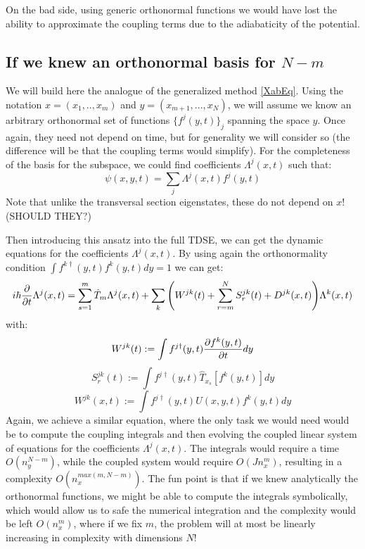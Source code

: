 \documentclass[11pt, a4paper]{article} %
\begin{document}
On the bad side, using generic orthonormal functions we would have lost the ability to approximate the coupling terms due to the adiabaticity of the potential.

\subsection{If we knew an orthonormal basis for $N-m$}
We will build here the analogue of the generalized method \eqref{XabEq}. Using the notation $x=(x_1,..,x_m)$ and $y=(x_{m+1},...,x_N)$, we will assume we know an arbitrary orthonormal set of functions $\{ f^j(y,t) \}_j$ spanning the space $y$. Once again, they need not depend on time, but for generality we will consider so (the difference will be that the coupling terms would simplify). For the completeness of the basis for the subspace, we could find coefficients $\Lambda^j(x,t)$ such that:
\begin{equation}
\psi(x,y,t)=\sum_j \Lambda^j(x,t) f^j(y,t)
\end{equation}
Note that unlike the transversal section eigenstates, these do not depend on $x$! (SHOULD THEY?)

Then introducing this ansatz into the full TDSE, we can get the dynamic equations for the coefficients $\Lambda^j(x,t)$. By using again the orthonormality condition $\int f^{k\dagger}(y,t)f^k(y,t)dy=1$ we can get:
\begin{equation}
i\hbar \pdv{}{t}\Lambda^j(x,t)= \sum_{s=1}^m \hat{T}_m \Lambda^j(x,t) + \sum_k \qty( W^{jk}(t)+\sum_{r=m}^NS^{jk}_r(t)+D^{jk}(x,t) )\Lambda^k(x,t)
\end{equation}
with:
\begin{equation}
W^{jk}(t):=\int f^{j\dagger}(y,t) \pdv{f^k(y,t)}{t} dy
\end{equation}
\begin{equation}
S^{jk}_r(t):=\int f^{j\dagger}(y,t) \hat{T}_{x_s}[f^k(y,t)] dy
\end{equation}
\begin{equation}
W^{jk}(x,t):=\int f^{j\dagger}(y,t)U(x,y,t) f^k(y,t) dy
\end{equation}
Again, we achieve a similar equation, where the only task we would need would be to compute the coupling integrals and then evolving the coupled linear system of equations for the coefficients $\Lambda^j(x,t)$. The integrals would require a time $O(n_y^{N-m})$, while the coupled system would require $O(Jn_x^m)$, resulting in a complexity $O(n_x^{max(m, N-m)})$. The fun point is that if we knew analytically the orthonormal functions, we might be able to compute the integrals symbolically, which would allow us to safe the numerical integration and the complexity would be left $O(n_x^m)$, where if we fix $m$, the problem will at most be linearly increasing in complexity with dimensions $N$!
\end{document}
